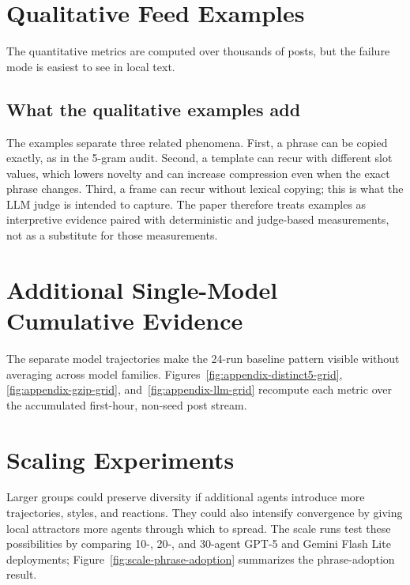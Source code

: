 \section{Qualitative Feed Examples}
\label{app:qualitative-feed-examples}

The quantitative metrics are computed over thousands of posts, but the failure mode is easiest to see in local text.

\subsection{What the qualitative examples add}
\label{app:qualitative-interpretation}

The examples separate three related phenomena. First, a phrase can be copied exactly, as in the 5-gram audit. Second, a template can recur with different slot values, which lowers novelty and can increase compression even when the exact phrase changes. Third, a frame can recur without lexical copying; this is what the LLM judge is intended to capture. The paper therefore treats examples as interpretive evidence paired with deterministic and judge-based measurements, not as a substitute for those measurements.

\section{Additional Single-Model Cumulative Evidence}
\label{app:single-model-cumulative}

The separate model trajectories make the 24-run baseline pattern visible without averaging across model families. Figures~\ref{fig:appendix-distinct5-grid}, \ref{fig:appendix-gzip-grid}, and~\ref{fig:appendix-llm-grid} recompute each metric over the accumulated first-hour, non-seed post stream.

\section{Scaling Experiments}
\label{app:scaling}

Larger groups could preserve diversity if additional agents introduce more trajectories, styles, and reactions. They could also intensify convergence by giving local attractors more agents through which to spread. The scale runs test these possibilities by comparing 10-, 20-, and 30-agent GPT-5 and Gemini Flash Lite deployments; Figure~\ref{fig:scale-phrase-adoption} summarizes the phrase-adoption result.

